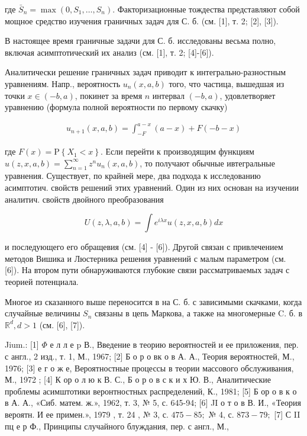 \documentclass[10pt]{article}
\begin{document}
где $\bar{S}_{n}=\max \left(0, S_{1}, \ldots, S_{n}\right)$. Факторизационные тождества представляют собой мощное средство изучения граничных задач для С. б. (см. [1], т. 2; [2], [3]).



В настоящее время граничные задачи для С. б. исследованы весьма полно, включая асимптотический их анализ (см. [1], т. 2; [4]-[6]).



Аналитически решение граничных задач приводит к интегрально-разностным уравнениям. Напр., вероятность $u_{n}(x, a, b)$ того, что частица, вышедшая из точки $x \in(-b, a)$, покинет за время $n$ интервал $(-b, a)$, удовлетворяет уравнению (формула полной вероятности по первому скачку)



\[

\begin{gathered}

u_{n+1}(x, a, b)=\int_{-F}^{a-x}(a-x)+F(-b-x)

\end{gathered}

\]



где $F(x)=\mathrm{P}\left\{X_{1}<x\right\}$. Если перейти к производящим функциям $u(z, x, a, b)=\sum_{n=1}^{\infty} z^{n} u_{n}(x, a, b)$, то получают обычные ивтегральные уравнения. Существует, по крайней мере, два подхода к исследованию асимптотич. свойств решений этих уравнений. Один из них основан на изучении аналитич. свойств двойного преобразования



\[

U(z, \lambda, a, b)=\int e^{i \lambda x} u(z, x, a, b) d x

\]



и последующего его обращевия (см. [4] - [6]). Другой связан с привлечением методов Вишика и Люстерника решения уравнений с малым параметром (см. [6]). На втором пути обнаруживаются глубокие связи рассматриваемых задач с теорией потенциала.



Многое из сказанного выше переносится в на С. б. с зависимыми скачками, когда случайные величины $S_{n}$ связаны в цепь Маркова, а также на многомерные C. б. в $\mathbb{R}^{d}, d>1$ (см. [6], [7]).



Jium.: [1] $\Phi$ е л л е p В., Введение в теорию вероятностей и ее приложения, пер. с англ., 2 изд., т. 1, М., 1967; [2] Б о р о вк о в А. А., Теория вероятностей, М., 1976; [3] е г о ж е, Вероятностные процессы в теории массового обслуживания, М., 1972 ; [4] К ор о л ю к В. С., Б о р о в с к и х Ю. В., Аналитические проблемы асимштотики веронтностных распределений, К., 1981; [5] Б ор о в к о в А. А., «Сиб. матем. ж.», 1962, т. 3, № 5, с. 645-94; [6] JI о т о в В. И., «Теория вероятн. И ее примен.», 1979 , т. 24 , № 3, с. $475-85 ;$ № 4, с. $873-79 ;$ [7] С II пц е р Ф., Принципы случайного блуждания, пер. с англ., М.,
\end{document}
